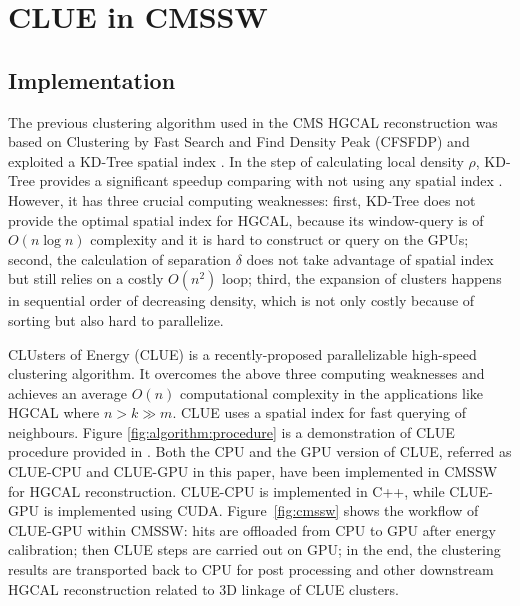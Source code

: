 \section{CLUE in CMSSW}
\label{sec:aglgorithm}

\subsection{Implementation}


The previous clustering algorithm \cite{Chen:2017btc} used in the CMS HGCAL reconstruction was based on Clustering by Fast Search and Find Density Peak (CFSFDP) \cite{rodriguez2014clustering} and exploited a KD-Tree spatial index \cite{Bentley:1975:MBS:361002.361007}. In the step of calculating local density $\rho$, KD-Tree provides a significant speedup comparing with not using any spatial index \cite{Chen:2017btc}. However, it has three crucial computing weaknesses: first, KD-Tree does not provide the optimal spatial index for HGCAL, because its window-query is of $O(n\log n)$ complexity and it is hard to construct or query on the GPUs; second, the calculation of separation $\delta$ does not take advantage of spatial index but still relies on a costly $O(n^2)$ loop; third, the expansion of clusters happens in sequential order of decreasing density, which is not only costly because of sorting but also hard to parallelize.


CLUsters of Energy (CLUE) \cite{cluepaper} is a recently-proposed parallelizable high-speed clustering algorithm. It overcomes the above three computing weaknesses and achieves an average $O(n)$ computational complexity in the applications like HGCAL where $n> k \gg m$. CLUE uses a spatial index \cite{bentley1979data} for fast querying of neighbours. Figure \ref{fig:algorithm:procedure} is a demonstration of CLUE procedure provided in \cite{cluepaper}. Both the CPU and the GPU version of CLUE, referred as CLUE-CPU and CLUE-GPU in this paper, have been implemented in CMSSW for HGCAL reconstruction. CLUE-CPU is implemented in C++, while CLUE-GPU is implemented using CUDA. Figure~\ref{fig:cmssw} shows the workflow of CLUE-GPU within CMSSW: hits are offloaded from CPU to GPU after energy calibration; then CLUE steps are carried out on GPU; in the end, the clustering results are transported back to CPU for post processing and other downstream HGCAL reconstruction related to 3D linkage of CLUE clusters. 

